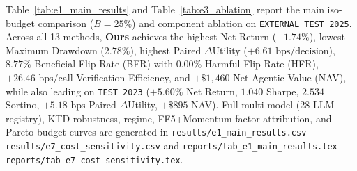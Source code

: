 \documentclass[10pt,a4paper,twocolumn]{article}
\begin{document}
Table~\ref{tab:e1_main_results} and Table~\ref{tab:e3_ablation} report the main iso-budget comparison ($B = 25\%$) and component ablation on \texttt{EXTERNAL\_TEST\_2025}. Across all 13 methods, \textbf{Ours} achieves the highest Net Return ($-1.74\%$), lowest Maximum Drawdown ($2.78\%$), highest Paired $\Delta$Utility ($+6.61\text{ bps/decision}$), $8.77\%$ Beneficial Flip Rate (BFR) with $0.00\%$ Harmful Flip Rate (HFR), $+26.46\text{ bps/call}$ Verification Efficiency, and $+\$1,460$ Net Agentic Value (NAV), while also leading on \texttt{TEST\_2023} ($+5.60\%$ Net Return, $1.040$ Sharpe, $2.534$ Sortino, $+5.18\text{ bps}$ Paired $\Delta$Utility, $+\$895$ NAV). Full multi-model (28-LLM registry), KTD robustness, regime, FF5+Momentum factor attribution, and Pareto budget curves are generated in \texttt{results/e1\_main\_results.csv}--\texttt{results/e7\_cost\_sensitivity.csv} and \texttt{reports/tab\_e1\_main\_results.tex}--\texttt{reports/tab\_e7\_cost\_sensitivity.tex}.



\end{document}
